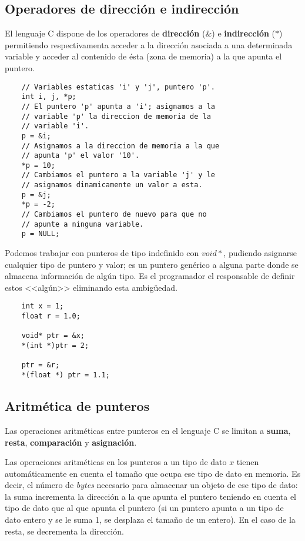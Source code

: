 \documentclass[a4paper, 11pt, titlepage]{article}
\begin{document}
    \subsection{Operadores de dirección e indirección}

    El lenguaje C dispone de los operadores de \textbf{dirección} (\textit{$\&$}) e \textbf{indirección} 
    (\textit{$*$}) permitiendo respectivamenta acceder a la dirección asociada a una determinada variable
    y acceder al contenido de ésta (zona de memoria) a la que apunta el puntero.

    \begin{lstlisting}
    // Variables estaticas 'i' y 'j', puntero 'p'. 
    int i, j, *p;
    // El puntero 'p' apunta a 'i'; asignamos a la 
    // variable 'p' la direccion de memoria de la 
    // variable 'i'.
    p = &i;
    // Asignamos a la direccion de memoria a la que 
    // apunta 'p' el valor '10'.
    *p = 10;
    // Cambiamos el puntero a la variable 'j' y le 
    // asignamos dinamicamente un valor a esta.
    p = &j;
    *p = -2;
    // Cambiamos el puntero de nuevo para que no 
    // apunte a ninguna variable.
    p = NULL;
    \end{lstlisting}

    Podemos trabajar con punteros de tipo indefinido con \textit{$void *$}, pudiendo asignarse cualquier
    tipo de puntero y valor; es un puntero genérico a alguna parte donde se almacena información
    de algún tipo. Es el programador el responsable de definir estos <<algún>> eliminando esta 
    ambigüedad.

    \begin{lstlisting}
    int x = 1;
    float r = 1.0;

    void* ptr = &x;
    *(int *)ptr = 2;

    ptr = &r;
    *(float *) ptr = 1.1;
    \end{lstlisting}

    \subsection{Aritmética de punteros}

    Las operaciones aritméticas entre punteros en el lenguaje C se limitan a \textbf{suma}, 
    \textbf{resta}, \textbf{comparación} y \textbf{asignación}.

    Las operaciones aritméticas en los punteros a un tipo de dato $x$ tienen automáticamente en 
    cuenta el tamaño que ocupa ese tipo de dato en memoria. Es decir, el número de \textit{bytes}
    necesario para almacenar un objeto de ese tipo de dato: la suma incrementa la dirección a 
    la que apunta el puntero teniendo en cuenta el tipo de dato que al que apunta el puntero (si 
    un puntero apunta a un tipo de dato entero y se le suma 1, se desplaza el tamaño de un entero).
    En el caso de la resta, se decrementa la dirección.
\end{document}
